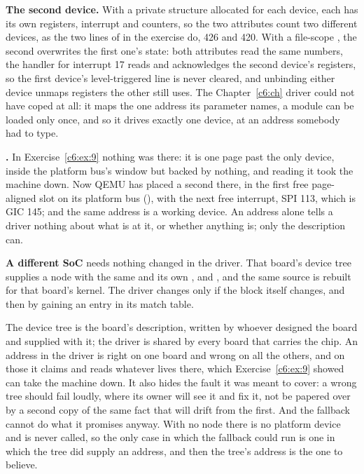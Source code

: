 \textbf{The second device.} With a private structure allocated for each device, each 
has its own registers, interrupt and counters, so the two  attributes count two
different devices, as the two lines of  in the exercise do, 426 and 420.
With a file-scope , the second  overwrites the first one's state: both
attributes read the same numbers, the handler for interrupt 17 reads and acknowledges the second
device's registers, so the first device's level-triggered line is never cleared, and unbinding
either device unmaps registers the other still uses. The Chapter~\ref{c6:ch} driver could not have
coped at all: it maps the one address its  parameter names, a module can be loaded only
once, and so it drives exactly one device, at an address somebody had to type.

\textbf{.} In Exercise~\ref{c6:ex:9} nothing was there: it is one page past the only
device, inside the platform bus's window but backed by nothing, and reading it took the machine
down. Now QEMU has placed a second  there, in the first free page-aligned slot on its
platform bus (), with the next free interrupt, SPI 113, which is GIC
145; and the same address is a working device. An address alone tells a driver nothing about what
is at it, or whether anything is; only the description can.

\textbf{A different SoC} needs nothing changed in the driver. That board's device tree supplies a
node with the same  and its own ,  and ,
and the same source is rebuilt for that board's kernel. The driver changes only if the block itself
changes, and then by gaining an entry in its match table.

 The device tree is the board's description, written by whoever designed the board and
supplied with it; the driver is shared by every board that carries the chip. An address in the
driver is right on one board and wrong on all the others, and on those it claims and reads whatever
lives there, which Exercise~\ref{c6:ex:9} showed can take the machine down. It also hides the fault
it was meant to cover: a wrong tree should fail loudly, where its owner will see it and fix it, not
be papered over by a second copy of the same fact that will drift from the first. And the fallback
cannot do what it promises anyway. With no node there is no platform device and  is
never called, so the only case in which the fallback could run is one in which the tree did supply
an address, and then the tree's address is the one to believe.
